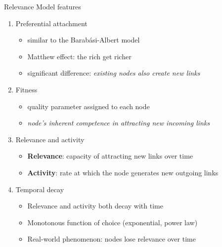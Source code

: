 \begin{frame}{Relevance Model features}
    \begin{enumerate}
        \item \alert{Preferential attachment}
        \begin{itemize}
            \item similar to the Barabási-Albert model
            \item Matthew effect: the rich get richer
            \item significant difference: \emph{existing nodes also create new links}
        \end{itemize}

        \item \alert{Fitness}
        \begin{itemize}
            \item quality parameter assigned to each node
            \item \emph{node’s inherent competence in attracting new incoming links}
        \end{itemize}

        \item \alert{Relevance and activity}
        \begin{itemize}
            \item \textbf{Relevance}: capacity of attracting new links over time
            \item \textbf{Activity}: rate at which the node generates new outgoing links
        \end{itemize}

        \item \alert{Temporal decay}
        \begin{itemize}
            \item Relevance and activity both decay with time
            \item Monotonous function of choice (exponential, power law)
            \item Real-world phenomenon: nodes lose relevance over time
        \end{itemize}
    \end{enumerate}
\end{frame}

